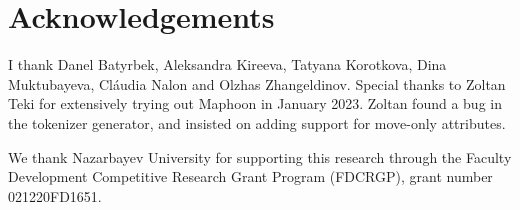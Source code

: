 \documentclass{article}
\begin{document}
\section{Acknowledgements}

I thank Danel Batyrbek, Aleksandra Kireeva,
Tatyana Korotkova, Dina Muktubayeva, Cl\'{a}udia Nalon and
Olzhas Zhangeldinov. 
Special thanks to Zoltan Teki for extensively trying out Maphoon
in January 2023. Zoltan found a bug in the tokenizer generator, and
insisted on adding support for move-only attributes.

\noindent
We thank Nazarbayev University for
supporting this research through the Faculty Development Competitive
Research Grant Program (FDCRGP), grant number 021220FD1651.



\end{document}
